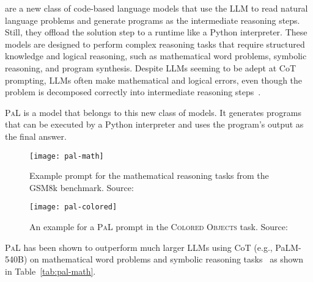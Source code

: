 are a new class of code-based language models that use the LLM to read natural language problems and generate programs as the intermediate reasoning steps. Still, they offload the solution step to a runtime like a Python interpreter.
These models are designed to perform complex reasoning tasks that require structured knowledge and logical reasoning, such as mathematical word problems, symbolic reasoning, and program synthesis.
Despite LLMs seeming to be adept at CoT prompting, LLMs often make mathematical and logical errors, even though the problem is decomposed correctly into intermediate reasoning steps~\cite{gao2022pal}.

\textsc{PaL} is a model that belongs to this new class of models.
It generates programs that can be executed by a Python interpreter and uses the program's output as the final answer.
\begin{figure}[h!]
	\centering
	\texttt{[image: pal-math]}
	\caption{Example prompt for the mathematical reasoning tasks from the GSM8k benchmark. Source: \textcite{gao2022pal}}
	\label{fig:pal-math}
\end{figure}
\begin{figure}[h!]
	\centering
	\texttt{[image: pal-colored]}
	\caption{An example for a \textsc{PaL} prompt in the \textsc{Colored Objects} task. Source: \textcite{gao2022pal}}
	\label{fig:pal-colored}
\end{figure}
\textsc{PaL} has been shown to outperform much larger LLMs using CoT (e.g., PaLM-540B) on mathematical word problems and symbolic reasoning tasks~\cite{gao2022pal} as shown in Table~\ref{tab:pal-math}.
